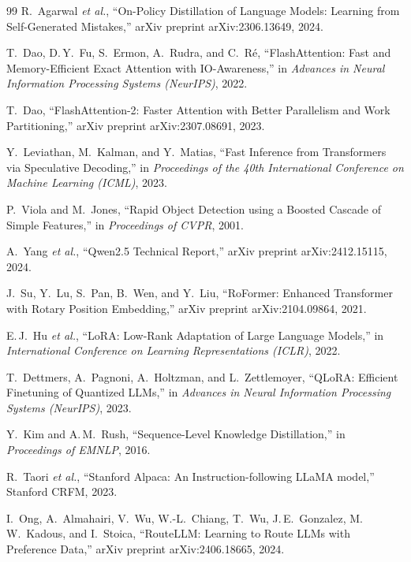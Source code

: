 \documentclass[11pt,a4paper]{article}
\begin{document}
\begin{thebibliography}{99}
R.~Agarwal \textit{et al.}, ``On-Policy Distillation of Language Models: Learning from Self-Generated Mistakes,'' arXiv preprint arXiv:2306.13649, 2024.

T.~Dao, D.\,Y.~Fu, S.~Ermon, A.~Rudra, and C.~Ré, ``FlashAttention: Fast and Memory-Efficient Exact Attention with IO-Awareness,'' in \textit{Advances in Neural Information Processing Systems (NeurIPS)}, 2022.

T.~Dao, ``FlashAttention-2: Faster Attention with Better Parallelism and Work Partitioning,'' arXiv preprint arXiv:2307.08691, 2023.

Y.~Leviathan, M.~Kalman, and Y.~Matias, ``Fast Inference from Transformers via Speculative Decoding,'' in \textit{Proceedings of the 40th International Conference on Machine Learning (ICML)}, 2023.

P.~Viola and M.~Jones, ``Rapid Object Detection using a Boosted Cascade of Simple Features,'' in \textit{Proceedings of CVPR}, 2001.

A.~Yang \textit{et al.}, ``Qwen2.5 Technical Report,'' arXiv preprint arXiv:2412.15115, 2024.

J.~Su, Y.~Lu, S.~Pan, B.~Wen, and Y.~Liu, ``RoFormer: Enhanced Transformer with Rotary Position Embedding,'' arXiv preprint arXiv:2104.09864, 2021.

E.\,J.~Hu \textit{et al.}, ``LoRA: Low-Rank Adaptation of Large Language Models,'' in \textit{International Conference on Learning Representations (ICLR)}, 2022.

T.~Dettmers, A.~Pagnoni, A.~Holtzman, and L.~Zettlemoyer, ``QLoRA: Efficient Finetuning of Quantized LLMs,'' in \textit{Advances in Neural Information Processing Systems (NeurIPS)}, 2023.

Y.~Kim and A.\,M.~Rush, ``Sequence-Level Knowledge Distillation,'' in \textit{Proceedings of EMNLP}, 2016.

R.~Taori \textit{et al.}, ``Stanford Alpaca: An Instruction-following LLaMA model,'' Stanford CRFM, 2023.

I.~Ong, A.~Almahairi, V.~Wu, W.-L.~Chiang, T.~Wu, J.\,E.~Gonzalez, M.\,W.~Kadous, and I.~Stoica, ``RouteLLM: Learning to Route LLMs with Preference Data,'' arXiv preprint arXiv:2406.18665, 2024.

\end{thebibliography}
\end{document}
